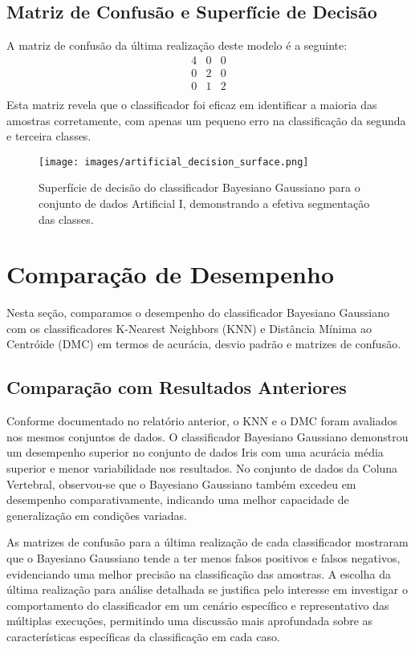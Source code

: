 \documentclass[12pt, a4paper]{report}
\begin{document}
\subsection{Matriz de Confusão e Superfície de Decisão}
A matriz de confusão da última realização deste modelo é a seguinte:
\[
\begin{array}{ccc}
4 & 0 & 0 \\
0 & 2 & 0 \\
0 & 1 & 2 \\
\end{array}
\]
Esta matriz revela que o classificador foi eficaz em identificar a maioria das amostras corretamente, com apenas um pequeno erro na classificação da segunda e terceira classes.

\begin{figure}[H]
\centering
\texttt{[image: images/artificial\_decision\_surface.png]}
\caption{Superfície de decisão do classificador Bayesiano Gaussiano para o conjunto de dados Artificial I, demonstrando a efetiva segmentação das classes.}
\label{fig:artificial_decision_surface}
\end{figure}


\section{Comparação de Desempenho}
Nesta seção, comparamos o desempenho do classificador Bayesiano Gaussiano com os classificadores K-Nearest Neighbors (KNN) e Distância Mínima ao Centróide (DMC) em termos de acurácia, desvio padrão e matrizes de confusão.

\subsection{Comparação com Resultados Anteriores}
Conforme documentado no relatório anterior, o KNN e o DMC foram avaliados nos mesmos conjuntos de dados. O classificador Bayesiano Gaussiano demonstrou um desempenho superior no conjunto de dados Iris com uma acurácia média superior e menor variabilidade nos resultados. No conjunto de dados da Coluna Vertebral, observou-se que o Bayesiano Gaussiano também excedeu em desempenho comparativamente, indicando uma melhor capacidade de generalização em condições variadas.

As matrizes de confusão para a última realização de cada classificador mostraram que o Bayesiano Gaussiano tende a ter menos falsos positivos e falsos negativos, evidenciando uma melhor precisão na classificação das amostras. A escolha da última realização para análise detalhada se justifica pelo interesse em investigar o comportamento do classificador em um cenário específico e representativo das múltiplas execuções, permitindo uma discussão mais aprofundada sobre as características específicas da classificação em cada caso.
\end{document}
